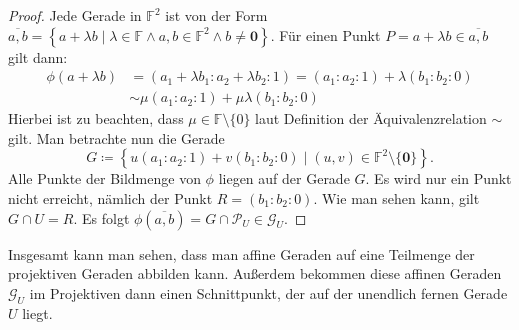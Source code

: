 \documentclass[hidelinks]{article}
\theoremstyle{plain}
\theoremstyle{definition}
\theoremstyle{rem}
\newcommand{\fnz}{\mathbb{F}\setminus\{0\}}
\newcommand{\ftwnz}{\mathbb{F}^{2}\setminus\{\boldsymbol 0\}}
\newcommand{\pu}{\mathcal{P}_U}
\newcommand{\gu}{\mathcal{G}_U}
\begin{document}
\begin{sloppypar}
\begin{proof}
    \newline
    Jede Gerade in $\mathbb{F}^2$ ist von der Form $\overline{a,b} = \left\{ a + \lambda b \mid \lambda \in \mathbb{F}\land a,b \in \mathbb{F}^2 \land b \neq \boldsymbol 0 \right\}$. Für einen Punkt $P = a + \lambda b \in \overline{a,b}$ gilt dann:
    \begin{equation*}
        \begin{aligned}
            \phi(a + \lambda b) & = (a_1 + \lambda b_1 : a_2 + \lambda b_2 : 1) = (a_1 : a_2 : 1) + \lambda (b_1 : b_2 : 0) \\
            & \sim \mu (a_1 : a_2 : 1) + \mu \lambda (b_1 : b_2 : 0)
        \end{aligned}
    \end{equation*}
    Hierbei ist zu beachten, dass $\mu \in \fnz$ laut Definition der Äquivalenzrelation $\sim$ gilt. Man betrachte nun die Gerade
    \begin{equation*}
        G \coloneqq \left\{ u(a_1 : a_2 : 1) + v(b_1 : b_2 : 0) \mid (u,v) \in \ftwnz \right\}.
    \end{equation*}
    Alle Punkte der Bildmenge von $\phi$ liegen auf der Gerade $G$. Es wird nur ein Punkt nicht erreicht, nämlich der Punkt $R = (b_1 : b_2 : 0)$. Wie man sehen kann, gilt $G \cap U = R$. Es folgt $\phi(\overline{a,b}) = G \cap \pu \in \gu$.
\end{proof}
Insgesamt kann man sehen, dass man affine Geraden auf eine Teilmenge der projektiven Geraden abbilden kann. Außerdem bekommen diese affinen Geraden $\gu$ im Projektiven dann einen Schnittpunkt, der auf der unendlich fernen Gerade $U$ liegt.

\end{sloppypar}
\end{document}
